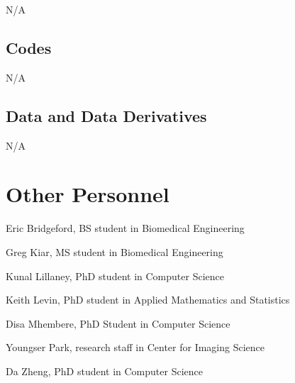 \documentclass[11pt]{article}
\newcommand{\jv}[1]{{\color{red}{\it [JV: #1]}}}
\newcommand{\jovo}[1]{{\color{red}{\it [JV: #1]}}}
\begin{document}
% 
% 
% 




N/A


\subsection{Codes}

N/A


\subsection{Data and Data Derivatives}


N/A

\section{Other Personnel}
\begin{compactitem}
\item Eric Bridgeford, BS student in Biomedical Engineering
\item Greg Kiar, MS student in Biomedical Engineering
\item Kunal Lillaney, PhD student in Computer Science
\item Keith Levin, PhD student in Applied Mathematics and Statistics
\item{Disa Mhembere, PhD Student in Computer Science}
\item{Youngser Park, research staff in Center for Imaging Science}
\item Da Zheng, PhD student in Computer Science
\end{compactitem}
\end{document}
